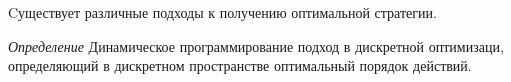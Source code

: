 Cуществует различные подходы к получению оптимальной стратегии.

\textit{Определение} Динамическое программирование подход в дискретной оптимизаци, определяющий в дискретном пространстве оптимальный порядок действий. \cite{bellman1966dynamic}



